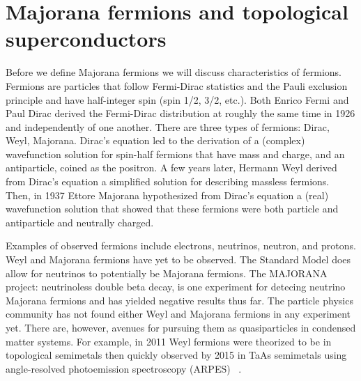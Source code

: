 \section{Majorana fermions and topological superconductors}

Before we define Majorana fermions we will discuss characteristics of fermions.
Fermions are particles that follow Fermi-Dirac statistics and the Pauli exclusion principle and have half-integer spin (spin 1/2, 3/2, etc.).
Both Enrico Fermi and Paul Dirac derived the Fermi-Dirac distribution at roughly the same time in 1926 and independently of one another.
There are three types of fermions: Dirac, Weyl, Majorana.
Dirac's equation led to the derivation of a (complex) wavefunction solution for spin-half fermions that have mass and charge, and an antiparticle, coined as the positron.
A few years later, Hermann Weyl derived from Dirac's equation a simplified solution for describing massless fermions.
Then, in 1937 Ettore Majorana hypothesized from Dirac's equation a (real) wavefunction solution that showed that these fermions were both particle and antiparticle and neutrally charged.

Examples of observed fermions include electrons, neutrinos, neutron, and protons.
Weyl and Majorana fermions have yet to be observed.
The Standard Model does allow for neutrinos to potentially be Majorana fermions.
The MAJORANA project: neutrinoless double beta decay, is one experiment for detecing neutrino Majorana fermions and has yielded negative results thus far.
The particle physics community has not found either Weyl and Majorana fermions in any experiment yet.
There are, however, avenues for pursuing them as quasiparticles in condensed matter systems.
For example, in 2011 Weyl fermions were theorized to be in topological semimetals then quickly observed by 2015 in TaAs semimetals using angle-resolved photoemission spectroscopy (ARPES)  ~\cite{wanTopologicalSemimetalFermiarc2011, xuDiscoveryWeylFermion2015, liWeylSemimetalTaAs2016}.

